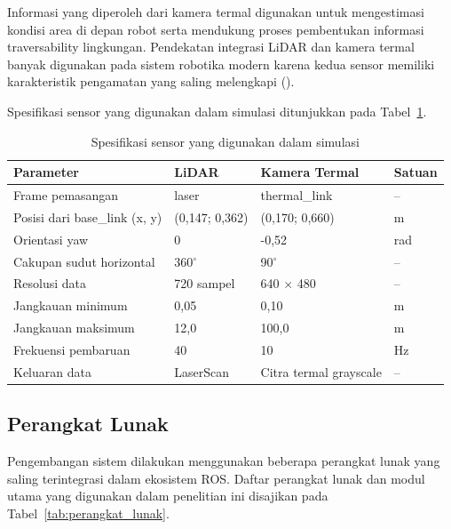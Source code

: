 Informasi yang diperoleh dari kamera termal digunakan untuk mengestimasi kondisi area di depan robot serta mendukung proses pembentukan informasi traversability lingkungan. Pendekatan integrasi LiDAR dan kamera termal banyak digunakan pada sistem robotika modern karena kedua sensor memiliki karakteristik pengamatan yang saling melengkapi (\cite{Schichler2025}).

Spesifikasi sensor yang digunakan dalam simulasi ditunjukkan pada Tabel~\ref{tab:spesifikasi_sensor}.

\begin{table}[H]
\centering
\caption{Spesifikasi sensor yang digunakan dalam simulasi}
\label{tab:spesifikasi_sensor}
\begin{tabular}{llll}
\toprule
\textbf{Parameter} & \textbf{LiDAR} & \textbf{Kamera Termal} & \textbf{Satuan} \\
\midrule
Frame pemasangan & laser & thermal\_link & -- \\
Posisi dari base\_link (x, y) & (0,147; 0,362) & (0,170; 0,660) & m \\
Orientasi yaw & 0 & -0,52 & rad \\
Cakupan sudut horizontal & 360$^\circ$ & 90$^\circ$ & -- \\
Resolusi data & 720 sampel & 640 $\times$ 480 & -- \\
Jangkauan minimum & 0,05 & 0,10 & m \\
Jangkauan maksimum & 12,0 & 100,0 & m \\
Frekuensi pembaruan & 40 & 10 & Hz \\
Keluaran data & LaserScan & Citra termal grayscale & -- \\
\bottomrule
\end{tabular}
\end{table}

\subsection{Perangkat Lunak}
\label{sec:perangkat_lunak}

Pengembangan sistem dilakukan menggunakan beberapa perangkat lunak yang saling terintegrasi dalam ekosistem ROS. Daftar perangkat lunak dan modul utama yang digunakan dalam penelitian ini disajikan pada Tabel~\ref{tab:perangkat_lunak}.

